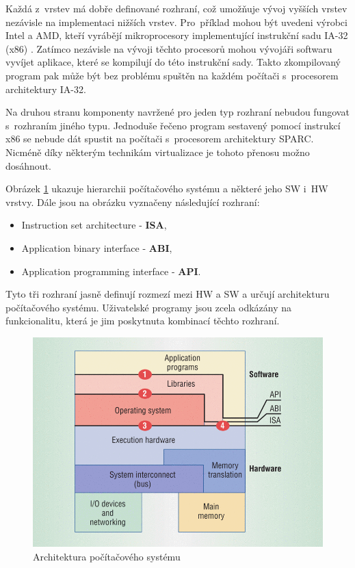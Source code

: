 Každá z~vrstev má dobře definované rozhraní, což umožňuje vývoj vyšších vrstev nezávisle na implementaci nižších vrstev.
Pro~příklad mohou být uvedeni výrobci Intel a AMD, kteří vyrábějí
mikroprocesory implementující instrukční sadu IA-32 (x86) \cite{book:iee:vm_architecture}. Zatímco nezávisle na vývoji
těchto procesorů mohou vývojáři softwaru vyvíjet aplikace, které se kompilují do této instrukční sady. Takto zkompilovaný
program pak může být bez problému spuštěn na každém počítači s~procesorem architektury IA-32.

Na druhou stranu komponenty navržené pro jeden typ rozhraní nebudou fungovat s~rozhraním jiného typu. Jednoduše řečeno program
sestavený pomocí instrukcí x86 se nebude dát spustit na počítači s~procesorem architektury SPARC. Nicméně díky některým technikám
virtualizace je tohoto přenosu možno dosáhnout. 

Obrázek \ref{figure:computer_architecture} ukazuje hierarchii počítačového systému a některé jeho SW i~HW vrstvy. Dále jsou
na obrázku vyznačeny následující rozhraní:
\begin{itemize}
  \item Instruction set architecture - \textbf{ISA},
  \item Application binary interface - \textbf{ABI},
  \item Application programming interface - \textbf{API}.
\end{itemize}
Tyto tři rozhraní jasně definují rozmezí mezi HW a SW a určují architekturu počítačového systému. Uživatelské programy jsou
zcela odkázány na funkcionalitu, která je jim poskytnuta kombinací těchto rozhraní.
\begin{figure}
  \centering
  \includegraphics[scale=0.3]{assets/png/ca.png}
  \caption[Architektura počítačového systému]{Architektura počítačového systému \cite{book:iee:vm_architecture}}
  \label{figure:computer_architecture}
\end{figure}
